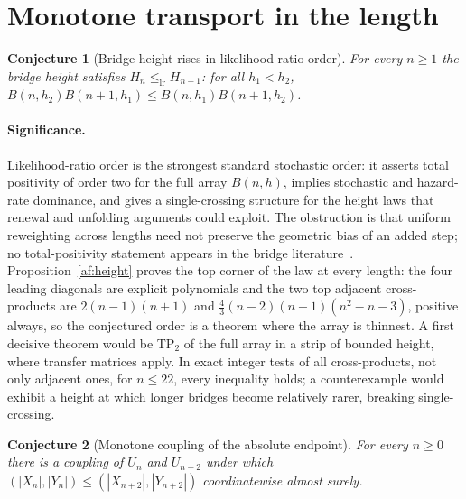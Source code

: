\documentclass[11pt]{article}
\newtheorem{conjecture}{Conjecture}
\theoremstyle{definition}
\begin{document}
\section{Monotone transport in the length}

\begin{conjecture}[Bridge height rises in likelihood-ratio order]\label{af4}
For every $n\ge1$ the bridge height satisfies $H_n\le_{\mathrm{lr}}H_{n+1}$: for all $h_1<h_2$, $B(n,h_2)B(n+1,h_1)\le B(n,h_1)B(n+1,h_2)$.
\end{conjecture}

\paragraph{Significance.}
Likelihood-ratio order is the strongest standard stochastic order: it asserts total positivity of order two for the full array $B(n,h)$, implies stochastic and hazard-rate dominance, and gives a single-crossing structure for the height laws that renewal and unfolding arguments could exploit.  The obstruction is that uniform reweighting across lengths need not preserve the geometric bias of an added step; no total-positivity statement appears in the bridge literature~\cite{HW62,DG19}.  Proposition~\ref{af:height} proves the top corner of the law at every length: the four leading diagonals are explicit polynomials and the two top adjacent cross-products are $2(n-1)(n+1)$ and $\tfrac43(n-2)(n-1)(n^2-n-3)$, positive always, so the conjectured order is a theorem where the array is thinnest.  A first decisive theorem would be TP${}_2$ of the full array in a strip of bounded height, where transfer matrices apply.  In exact integer tests of all cross-products, not only adjacent ones, for $n\le22$, every inequality holds; a counterexample would exhibit a height at which longer bridges become relatively rarer, breaking single-crossing.

\begin{conjecture}[Monotone coupling of the absolute endpoint]\label{af5}
For every $n\ge0$ there is a coupling of $U_n$ and $U_{n+2}$ under which $(|X_n|,|Y_n|)\le(|X_{n+2}|,|Y_{n+2}|)$ coordinatewise almost surely.
\end{conjecture}
\end{document}

